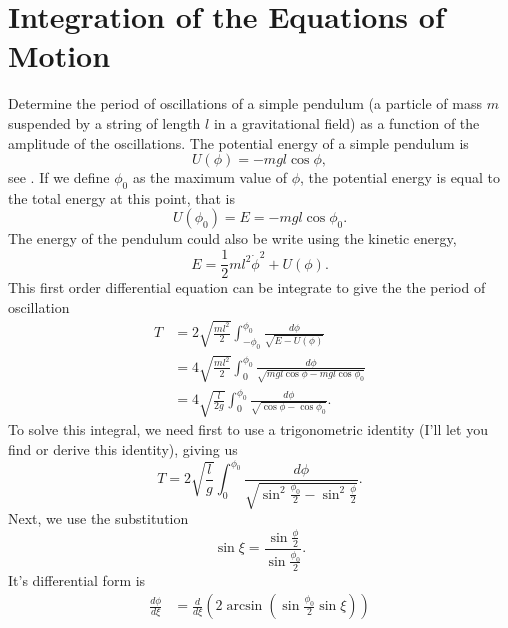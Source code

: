 \chapter{Integration of the Equations of Motion}


\begin{problem}
{
Determine the period of oscillations of a simple pendulum (a particle of mass $m$ suspended by a string of length $l$ in a gravitational field) as a function of the amplitude of the oscillations.
}
{
The potential energy of a simple pendulum is
\begin{equation*}
   U(\phi) = - mgl\cos{\phi},
\end{equation*}
see . If we define $\phi_0$ as the maximum value of $\phi$, the potential energy is equal to the total energy at this point, that is
\begin{equation*}
    U(\phi_0) = E = -mgl\cos{\phi_0}.
\end{equation*}
The energy of the pendulum could also be write using the kinetic energy,
\begin{equation*}
    E = \frac{1}{2}ml^2\Dot{\phi}^2 + U(\phi).
\end{equation*}
This first order differential equation can be integrate to give the the period of oscillation 
\begin{align*}
    T &= 2\sqrt{\frac{ml^2}{2}} \int_{-\phi_0}^{\phi_0} \frac{d\phi}{\sqrt{E-U(\phi)}} \\
    &= 4\sqrt{\frac{ml^2}{2}} \int_{0}^{\phi_0} \frac{d\phi}{\sqrt{mgl\cos{\phi}-mgl\cos{\phi_0}}} \\
    &= 4\sqrt{\frac{l}{2g}} \int_{0}^{\phi_0} \frac{d\phi}{\sqrt{\cos{\phi}-\cos{\phi_0}}}.
\end{align*}
To solve this integral, we need first to use a trigonometric identity (I'll let you find or derive this identity), giving us
\begin{equation*}
    T = 2\sqrt{\frac{l}{g}} \int_{0}^{\phi_0} \frac{d\phi}{\sqrt{\sin^2{\frac{\phi_0}{2}}-\sin^2{\frac{\phi}{2}}}}.
\end{equation*}
Next, we use the substitution
\begin{equation*}
    \sin{\xi} = \frac{\sin{\frac{\phi}{2}}}{\sin{\frac{\phi_0}{2}}}.
\end{equation*}
It's differential form is
\begin{align*}
    \frac{d\phi}{d\xi} &= \frac{d}{d\xi} \left( 2 \arcsin{\left(\sin{\frac{\phi_0}{2}}\sin{\xi}\right)} \right) \\

\end{align*}}
\end{problem}
